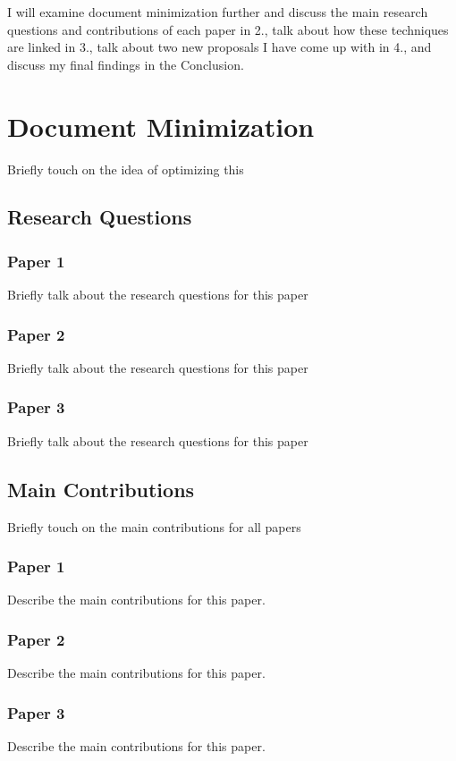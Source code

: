 \documentclass{acm_proc_article-sp}
\begin{document}
I will examine document minimization further and discuss the main research questions and contributions of each paper in 2., talk about how these techniques are linked in 3., talk about two new proposals I have come up with in 4., and discuss my final findings in the Conclusion.

\section{Document Minimization}

Briefly touch on the idea of optimizing this

\subsection{Research Questions}
\subsubsection{Paper 1}
Briefly talk about the research questions for this paper

\subsubsection{Paper 2}
Briefly talk about the research questions for this paper

\subsubsection{Paper 3}
Briefly talk about the research questions for this paper

\subsection{Main Contributions}
Briefly touch on the main contributions for all papers
\subsubsection{Paper 1}
Describe the main contributions for this paper.

\subsubsection{Paper 2}
Describe the main contributions for this paper.

\subsubsection{Paper 3}
Describe the main contributions for this paper.
\end{document}
